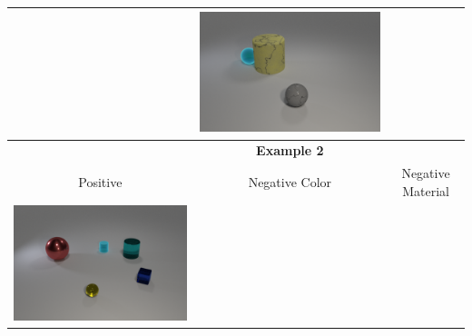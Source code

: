 \begin{table}
\begin{tabular}{@{}ccc@{}}
\begin{minipage}{.3\textwidth}
    \end{minipage}
    &
    \begin{minipage}{.3\textwidth}
      \includegraphics[width=\linewidth]{figures/clevr_datasets/sclevr_rel1.png}
    \end{minipage}
\\
\midrule
&\textbf{Example 2}& \\ \midrule
Positive & Negative Color & Negative Material \\
    \begin{minipage}{.3\textwidth}
      \includegraphics[width=\linewidth]{figures/clevr_datasets/sclevr_ori2.png}
    \end{minipage}
    &
    \begin{minipage}{.3\textwidth}

\end{minipage}
\end{tabular}
\end{table}
